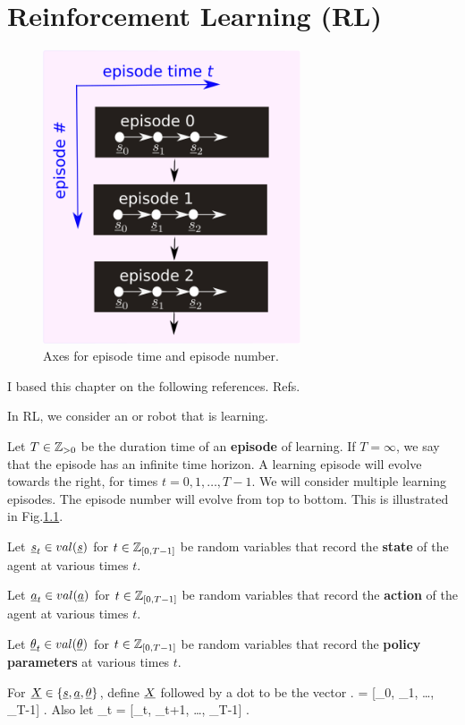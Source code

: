 \chapter{Reinforcement Learning (RL)}
\label{ch-RL}
\begin{figure}[h!]
\centering
\includegraphics[width=3in]{RL/episodes.png}
\caption{Axes 
for episode time and episode number.} 
\label{fig-epi}
\end{figure}

I based this chapter on the following 
references. Refs.\cite{fox}\cite{levine}

In RL, we consider an  or
robot that
is learning. 

Let $T\in {\mathbb{Z}}_{>0}$ be the duration time
of an {\bf episode} of learning.
If $T=\infty$, we say that the episode
has an infinite time horizon.
A learning episode will 
 evolve
towards the right,
 for times $t=0,1, \ldots, T-1$. 
We will consider multiple learning episodes.
The episode number will
evolve from top to bottom.
This is illustrated in Fig.\ref{fig-epi}.

 Let $\rvs_t\in val(\rvs) $
for $t\in {\mathbb{Z}}_{[0,T-1]}$ be random variables that record the {\bf state} of
the
agent at various times $t$.

Let $\rva_t\in val(\rva)$ for
$t\in {\mathbb{Z}}_{[0,T-1]}$ be random variables that record the {\bf action} of
the agent at various times $t$.

Let $\rvtheta_t\in val(\rvtheta)$
for $t\in {\mathbb{Z}}_{[0,T-1]}$ be
random variables that record the
 {\bf policy parameters} 
at various times $t$.



For $\rvX\in \{\rvs, \rva, \rvtheta\}$, define $\rvX$ followed by a dot to be the vector 
\beq
\rvX. = 
[\rvX_0, \rvX_1, \ldots, \rvX_{T-1}]
\;.
\eeq
Also let
\beq
\rvX_{\geq t} = 
[\rvX_t, \rvX_{t+1}, \ldots, \rvX_{T-1}]
\;.
\eeq

